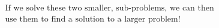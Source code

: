 \documentclass[preview]{standalone}
\begin{document}
\begin{center}
\begin{align*}
&\text{If we solve these two smaller, sub-problems, we can then} \\
&\text{use them to find a solution to a larger problem!}
\end{align*}
\end{center}
\end{document}
